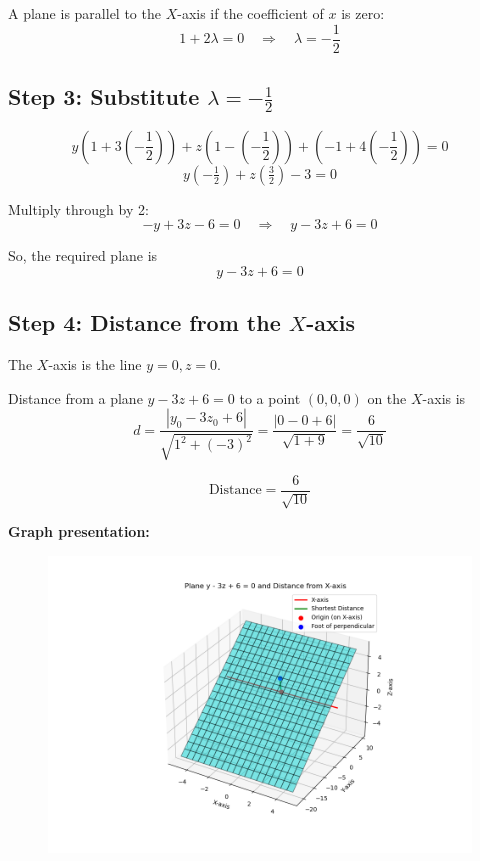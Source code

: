 \documentclass[journal]{IEEEtran}
\begin{document}
A plane is parallel to the $X$-axis if the coefficient of $x$ is zero:
\begin{equation}
1 + 2\lambda = 0 \quad \Rightarrow \quad \lambda = -\frac{1}{2}
\end{equation}

\subsection*{Step 3: Substitute $\lambda = -\frac{1}{2}$}

\begin{equation}
y\left(1 + 3\left(-\frac{1}{2}\right)\right) + z\left(1 - \left(-\frac{1}{2}\right)\right) + \left(-1 + 4\left(-\frac{1}{2}\right)\right) = 0
\end{equation}
\begin{equation}
y(-\tfrac{1}{2}) + z(\tfrac{3}{2}) - 3 = 0
\end{equation}

Multiply through by 2:
\begin{equation}
- y + 3z - 6 = 0 \quad \Rightarrow \quad y - 3z + 6 = 0
\end{equation}

So, the required plane is
\begin{equation}
\boxed{y - 3z + 6 = 0}
\end{equation}

\subsection*{Step 4: Distance from the $X$-axis}

The $X$-axis is the line $y = 0, z = 0$.  

Distance from a plane $y - 3z + 6 = 0$ to a point $(0,0,0)$ on the $X$-axis is
\begin{equation}
d = \frac{|y_0 - 3 z_0 + 6|}{\sqrt{1^2 + (-3)^2}} = \frac{|0 - 0 + 6|}{\sqrt{1 + 9}} = \frac{6}{\sqrt{10}}
\end{equation}

\begin{equation}
\boxed{\text{Distance} = \frac{6}{\sqrt{10}}}
\end{equation}


\textbf{Graph presentation:}
\begin{figure}[H]
\begin{center}
\includegraphics[width=0.6\columnwidth]{figs/fig8.png}
\end{center}
\caption{}
\label{fig:Fig}
\end{figure}
\end{document}
